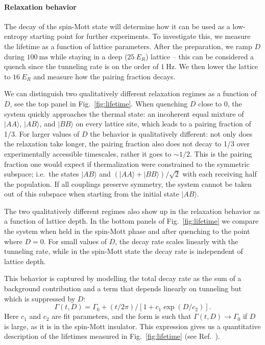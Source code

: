 \documentclass[aps,prl,twocolumn]{revtex4-1}
\begin{document}
\paragraph*{Relaxation behavior}
The decay of the spin-Mott state will determine how it can be used as a low-entropy starting point for further experiments. To investigate this, we measure the lifetime as a function of lattice parameters. After the preparation, we ramp $D$ during $100~\mathrm{ms}$ while staying in a deep ($25~E_R$) lattice -- this can be considered a quench since the tunneling rate is on the order of $1~\mathrm{Hz}$. We then lower the lattice to $16~E_R$ and measure how the pairing fraction decays. 

We can distinguish two qualitatively different relaxation regimes as a function of $D$, see the top panel in Fig.~\ref{fig:lifetime}. When quenching $D$ close to $0$, the system quickly approaches the thermal state: an incoherent equal mixture of $|AA\rangle$, $|AB\rangle$, and $|BB\rangle$ on every lattice site, which leads to a pairing fraction of 1/3. For larger values of $D$ the behavior is qualitatively different: not only does the relaxation take longer, the pairing fraction also does not decay to 1/3 over experimentally accessible timescales, rather it goes to $\sim\!1/2$. This is the pairing fraction one would expect if thermalization were constrained to the symmetric subspace; i.e.\ the states $|AB\rangle$ and $\left(|AA\rangle + |BB\rangle\right)/\sqrt{2}$ with each receiving half the population. If all couplings preserve symmetry, the system cannot be taken out of this subspace when starting from the initial state $|AB\rangle$.

The two qualitatively different regimes also show up in the relaxation behavior as a function of lattice depth.  In the bottom panels of Fig.~\ref{fig:lifetime} we compare the system when held in the spin-Mott phase and after quenching to the point where $D=0$.  For small values of $D$, the decay rate scales linearly with the tunneling rate, while in the spin-Mott state the decay rate is independent of lattice depth.

This behavior is captured by modelling the total decay rate as the sum of a background contribution and a term that depends linearly on tunneling but which is suppressed by $D$:
\begin{equation}
\label{eq:lifetime}
    \Gamma\left( t, D \right) = \Gamma_0 + \left(t/2\pi\right) / \left[ 1 + c_1\exp\left(D/c_2\right) \right].
\end{equation}
Here $c_1$ and $c_2$ are fit parameters, and the form is such that $\Gamma\left(t,D\right) \rightarrow \Gamma_0$ if $D$ is large, as it is in the spin-Mott insulator. This expression gives us a quantitative description of the lifetimes measured in Fig.~\ref{fig:lifetime} (see Ref.~\cite{Supplemental}).
\end{document}
